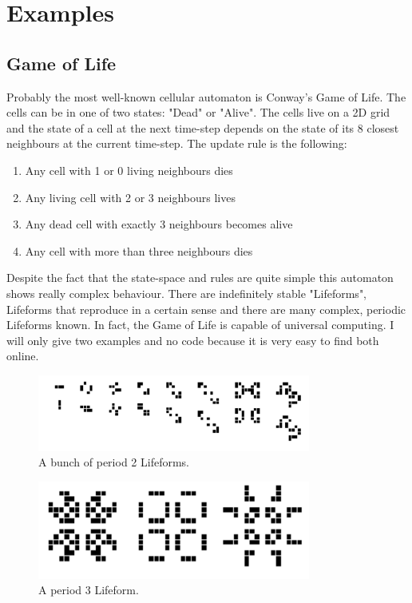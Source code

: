 \documentclass[12pt]{article}
\numberwithin{equation}{section}
\begin{document}
\section{Examples}
\subsection{Game of Life}
Probably the most well-known cellular automaton is Conway's Game of Life. The cells can be in one of two states: "Dead" or "Alive". The cells live on a 2D grid and the state of a cell at the next time-step depends on the state of its 8 closest neighbours at the current time-step. The update rule is the following:
\begin{enumerate}
\item Any cell with 1 or 0 living neighbours dies
\item Any living cell with 2 or 3 neighbours lives
\item Any dead cell with exactly 3 neighbours becomes alive
\item Any cell with more than three neighbours dies
\end{enumerate}
Despite the fact that the state-space and rules are quite simple this automaton shows really complex behaviour. There are indefinitely stable "Lifeforms", Lifeforms that reproduce in a certain sense and there are many complex, periodic Lifeforms known. In fact, the Game of Life is capable of universal computing. I will only give two examples and no code because it is very easy to find both online.
\begin{figure}[H]
\centering
\includegraphics[width=0.8\textwidth]{GOLPeriod2.png}
\caption{A bunch of period 2 Lifeforms.}
\label{GOL2}
\end{figure}  
\begin{figure}[H]
\centering
\includegraphics[width=0.8\textwidth]{GOLPeriod3.png}
\caption{A period 3 Lifeform.}
\label{GOL3}
\end{figure}  
\end{document}
